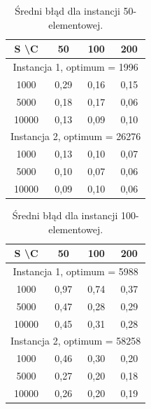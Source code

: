   \begin{table}[h!]
  \begin{center}
  \caption{Średni błąd dla instancji 50-elementowej.}
  \begin{tabular}{c|ccc}
    \hline
      S \textbackslash C & 50 & 100 & 200 \\
    \hline
      \multicolumn{4}{c}{Instancja 1, optimum = 1996} \\
    \hline
      1000  & 0,29 & 0,16 & 0,15 \\
      5000  & 0,18 & 0,17 & 0,06 \\
      10000 & 0,13 & 0,09 & 0,10 \\
    \hline
      \multicolumn{4}{c}{Instancja 2, optimum = 26276} \\
    \hline
      1000  & 0,13 & 0,10 & 0,07 \\
      5000  & 0,10 & 0,07 & 0,06 \\
      10000 & 0,09 & 0,10 & 0,06
  \end{tabular}
  \end{center}
  \end{table}

  \begin{table}[h!]
  \begin{center}
  \caption{Średni błąd dla instancji 100-elementowej.}
  \begin{tabular}{c|ccc}
    \hline
      S \textbackslash C & 50 & 100 & 200 \\
    \hline
      \multicolumn{4}{c}{Instancja 1, optimum = 5988} \\
    \hline
      1000  & 0,97 & 0,74 & 0,37 \\
      5000  & 0,47 & 0,28 & 0,29 \\
      10000 & 0,45 & 0,31 & 0,28 \\
    \hline
      \multicolumn{4}{c}{Instancja 2, optimum = 58258} \\
    \hline
      1000  & 0,46 & 0,30 & 0,20 \\
      5000  & 0,27 & 0,20 & 0,18 \\
      10000 & 0,26 & 0,20 & 0,19
  \end{tabular}
  \end{center}
  \end{table}


